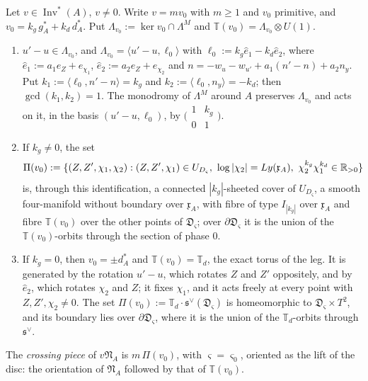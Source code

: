 \begin{lemma}[crossings]\label{lem:crossing}
Let $v\in\operatorname{Inv}^*(A)$, $v\ne0$. Write $v=mv_0$ with $m\ge1$ and $v_0$ primitive, and $v_0=k_g\,g^*_A+k_d\,d^*_A$.
Put $\Lambda_{v_0}:=\ker v_0\cap\Lambda^M$ and $\mathbb T(v_0)=\Lambda_{v_0}\otimes U(1)$.
\begin{enumerate}
\item $u'-u\in\Lambda_{v_0}$, and $\Lambda_{v_0}=\langle u'-u,\ell_0\rangle$ with $\ell_0:=k_g\hat e_1-k_d\hat e_2$, where $\hat
e_1:=a_1e_Z+e_{\chi_1}$, $\hat e_2:=a_2e_Z+e_{\chi_2}$ and $n=-w_u-w_{u'}+a_1(n'-n)+a_2n_y$. Put $k_1:=\langle
\ell_0,n'-n\rangle=k_g$ and $k_2:=\langle\ell_0,n_y\rangle=-k_d$; then $\gcd(k_1,k_2)=1$. The monodromy of $\Lambda^M$ around
$A$ preserves $\Lambda_{v_0}$ and acts on it, in the basis $(u'-u,\ell_0)$, by $\bigl(\begin{smallmatrix}1&k_g\\0&1
\end{smallmatrix}\bigr)$.
\item If $k_g\ne0$, the set
\[
\Pi(v_0):=\{(Z,Z',\chi_1,\chi_2):(Z,Z',\chi_1)\in U_{D_\varsigma},\ \log|\chi_2|=Ly(\mathfrak x_A),\ \chi_2^{k_g}\chi_1^{k_d}\in
\R_{>0}\}
\]
is, through this identification, a connected $|k_g|$-sheeted cover of $U_{D_\varsigma}$, a smooth four-manifold without
boundary over $\mathfrak x_A$, with
fibre of type $I_{|k_g|}$ over $\mathfrak x_A$ and fibre $\mathbb T(v_0)$ over the other points of $\mathfrak D_\varsigma$; over
$\partial\mathfrak D_\varsigma$ it is the union of the $\mathbb T(v_0)$-orbits through the section of phase $0$.
\item If $k_g=0$, then $v_0=\pm d^*_A$ and $\mathbb T(v_0)=\mathbb T_d$, the exact torus of the leg. It is generated by the
rotation $u'-u$, which rotates $Z$ and $Z'$ oppositely, and by $\hat e_2$, which rotates $\chi_2$ and $Z$; it fixes
$\chi_1$, and it acts freely at every point with $Z,Z',\chi_2\ne0$. The set $\Pi(v_0):=\mathbb T_d\cdot\mathfrak s^\vee
(\mathfrak D_\varsigma)$ is homeomorphic to $\mathfrak D_\varsigma\times T^2$, and its boundary lies over
$\partial\mathfrak D_\varsigma$, where it is the union of the $\mathbb T_d$-orbits through $\mathfrak s^\vee$.
\end{enumerate}
The \emph{crossing piece} of $v\mathfrak N_A$ is $m\,\Pi(v_0)$, with $\varsigma=\varsigma_0$, oriented as the lift of the
disc: the orientation of $\mathfrak N_A$ followed by that of $\mathbb T(v_0)$.
\end{lemma}

